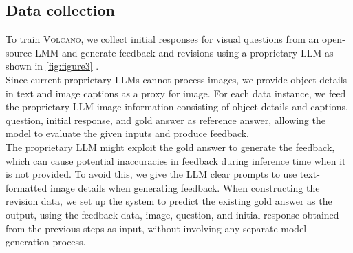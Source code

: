 \documentclass[11pt]{article}
\newcommand{\Ours}{\textsc{Volcano}}
\begin{document}
\subsection{Data collection}
\label{subsec:data}
To train {\Ours}, we collect initial responses for visual questions from an open-source LMM and generate feedback and revisions using a proprietary LLM as shown in \autoref{fig:figure3} \citep{akyürek2023rl4f, madaan2023selfrefine, selfee2023, wang2023shepherd, kim2023prometheus}.
\\
Since current proprietary LLMs cannot process images, we provide object details in text and image captions as a proxy for image. For each data instance, we feed the proprietary LLM image information consisting of object details and captions, question, initial response, and gold answer as reference answer, allowing the model to evaluate the given inputs and produce feedback. \\
The proprietary LLM might exploit the gold answer to generate the feedback, which can cause potential inaccuracies in feedback during inference time when it is not provided. To avoid this, we give the LLM clear prompts to use text-formatted image details when generating feedback. When constructing the revision data, we set up the system to predict the existing gold answer as the output, using the feedback data, image, question, and initial response obtained from the previous steps as input, without involving any separate model generation process.
\end{document}
